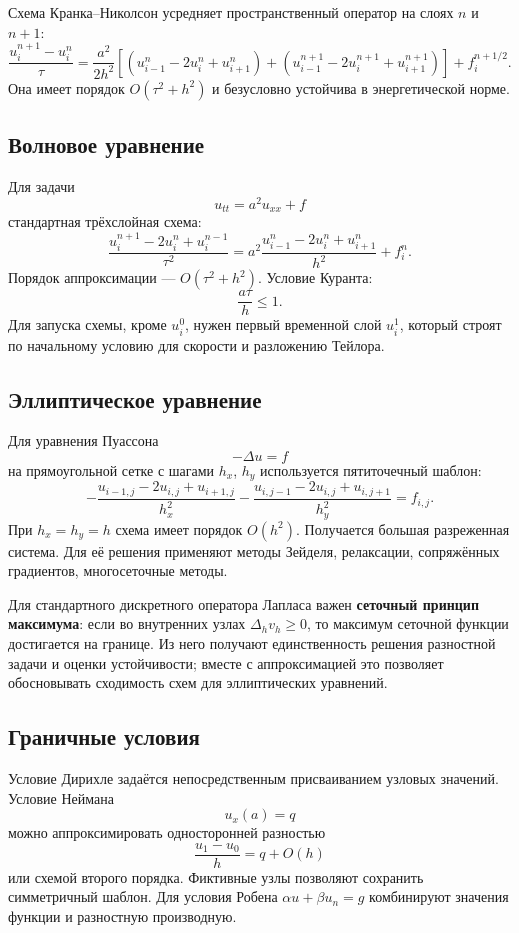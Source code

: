 Схема Кранка--Николсон усредняет пространственный оператор на слоях $n$ и $n+1$:
\[
\frac{u_i^{n+1}-u_i^n}{\tau}
=
\frac{a^2}{2h^2}
\left[
(u_{i-1}^{n}-2u_i^{n}+u_{i+1}^{n})+
(u_{i-1}^{n+1}-2u_i^{n+1}+u_{i+1}^{n+1})
\right]
+f_i^{n+1/2}.
\]
Она имеет порядок $O(\tau^2+h^2)$ и безусловно устойчива в энергетической норме.

\subsection{Волновое уравнение}

Для задачи
\[
    u_{tt}=a^2u_{xx}+f
\]
стандартная трёхслойная схема:
\[
    \frac{u_i^{n+1}-2u_i^n+u_i^{n-1}}{\tau^2}
    =a^2\frac{u_{i-1}^n-2u_i^n+u_{i+1}^n}{h^2}+f_i^n.
\]
Порядок аппроксимации --- $O(\tau^2+h^2)$. Условие Куранта:
\[
    \frac{a\tau}{h}\leq1.
\]
Для запуска схемы, кроме $u_i^0$, нужен первый временной слой $u_i^1$, который
строят по начальному условию для скорости и разложению Тейлора.

\subsection{Эллиптическое уравнение}

Для уравнения Пуассона
\[
    -\Delta u=f
\]
на прямоугольной сетке с шагами $h_x$, $h_y$ используется пятиточечный шаблон:
\[
-\frac{u_{i-1,j}-2u_{i,j}+u_{i+1,j}}{h_x^2}
-\frac{u_{i,j-1}-2u_{i,j}+u_{i,j+1}}{h_y^2}
=f_{i,j}.
\]
При $h_x=h_y=h$ схема имеет порядок $O(h^2)$. Получается большая разреженная
система. Для её решения применяют методы Зейделя, релаксации, сопряжённых
градиентов, многосеточные методы.

Для стандартного дискретного оператора Лапласа важен \textbf{сеточный принцип
максимума}: если во внутренних узлах $\Delta_h v_h\ge0$, то максимум сеточной
функции достигается на границе. Из него получают единственность решения
разностной задачи и оценки устойчивости; вместе с аппроксимацией это позволяет
обосновывать сходимость схем для эллиптических уравнений.

\subsection{Граничные условия}

Условие Дирихле задаётся непосредственным присваиванием узловых значений.
Условие Неймана
\[
    u_x(a)=q
\]
можно аппроксимировать односторонней разностью
\[
    \frac{u_1-u_0}{h}=q+O(h)
\]
или схемой второго порядка. Фиктивные узлы позволяют сохранить симметричный
шаблон. Для условия Робена $\alpha u+\beta u_n=g$ комбинируют значения функции
и разностную производную.

